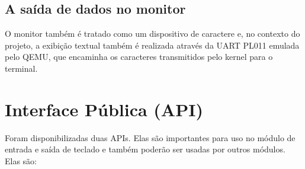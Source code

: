 \subsection{A saída de dados no monitor}
	O monitor também é tratado como um dispositivo de caractere e, no contexto do projeto, a exibição textual também é realizada através da UART PL011 emulada pelo QEMU, que encaminha os caracteres transmitidos pelo kernel para o terminal.



\section{Interface Pública (API)}


Foram disponibilizadas duas APIs. Elas são importantes para uso no módulo de entrada e saída de teclado e também poderão ser usadas por outros módulos. Elas são:

